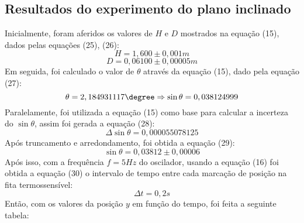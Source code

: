 \documentclass[12pt, letterpaper]{article}
\begin{document}
    \subsection{Resultados do experimento do plano inclinado}
    Inicialmente, foram aferidos os valores de $H$ e $D$ mostrados na equação (15), dados pelas equações (25), (26):
    \begin{equation}
        H = 1,600 \pm 0,001 m
    \end{equation}
    \begin{equation}
        D = 0,06100 \pm 0,00005 m
    \end{equation}
    Em seguida, foi calculado o valor de $\theta$ através da equação (15), dado pela equação (27):
    \begin{equation}
        \theta = 2,184931117 \degree \Rightarrow \sin{\theta} = 0,038124999
    \end{equation}
    Paralelamente, foi utilizada a equação (15) como base para calcular a incerteza do $\sin{\theta}$, assim foi gerada a equação (28):
    \begin{equation}
        \Delta \sin{\theta} = 0,000055078125
    \end{equation}
    Após truncamento e arredondamento, foi obtida a equação (29):
    \begin{equation}
        \sin{\theta} = 0,03812 \pm 0,00006
    \end{equation}
    Após isso, com a frequência $f = 5Hz$ do oscilador, usando a equação (16) foi obtida a equação (30) o intervalo de tempo entre cada marcação de posição na fita termossensível:
    \begin{equation}
        \Delta t = 0,2 s
    \end{equation}
     Então, com os valores  da posição $y$ em função do tempo, foi feita a seguinte tabela:
\end{document}
